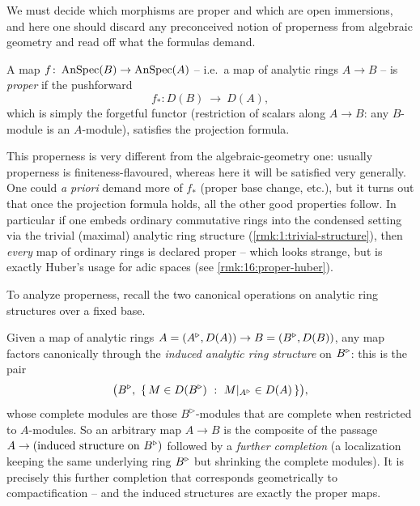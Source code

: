 We must decide which morphisms are proper and which are open immersions, and here one
should discard any preconceived notion of properness from algebraic geometry and read
off what the formulas demand.

\begin{definition}
\label{def:16:proper}
A map $f\colon\operatorname{AnSpec}(B)\to\operatorname{AnSpec}(A)$ -- i.e.\ a map of analytic rings $A\to B$ -- is
\emph{proper} if the pushforward
\begin{equation*}
f_*\colon D(B)\ \longrightarrow\ D(A),
\end{equation*}
which is simply the forgetful functor (restriction of scalars along $A\to B$: any
$B$-module is an $A$-module), satisfies the projection formula.
\end{definition}

\begin{remark}
\label{rmk:16:proper-strange}
This properness is very different from the algebraic-geometry one: usually properness
is finiteness-flavoured, whereas here it will be satisfied very generally. One could
\emph{a priori} demand more of $f_*$ (proper base change, etc.), but it turns out that
once the projection formula holds, all the other good properties follow. In particular
if one embeds ordinary commutative rings into the condensed setting via the trivial
(maximal) analytic ring structure (\cref{rmk:1:trivial-structure}), then \emph{every}
map of ordinary rings is declared proper -- which looks strange, but is exactly
Huber's usage for adic spaces (see \cref{rmk:16:proper-huber}).
\end{remark}

To analyze properness, recall the two canonical operations on analytic ring
structures over a fixed base.

\begin{remark}
\label{rmk:16:induced-structure}
Given a map of analytic rings $A=(A^{\triangleright},D(A))\to B=(B^{\triangleright},D(B))$, any map factors
canonically through the \emph{induced analytic ring structure} on $B^{\triangleright}$: this is
the pair
\begin{equation}
\label{eq:16:induced-structure}
\bigl(B^{\triangleright},\ \{\,M\in D(B^{\triangleright})\ :\ M|_{A^{\triangleright}}\in D(A)\,\}\bigr),
\end{equation}
whose complete modules are those $B^\triangleright$-modules that are complete when
restricted to $A$-modules. So an arbitrary map $A\to B$ is the composite of the
passage $A\to(\text{induced structure on }B^{\triangleright})$ followed by a \emph{further
completion} (a localization keeping the same underlying ring $B^{\triangleright}$ but shrinking the
complete modules). It is precisely this further completion that corresponds
geometrically to compactification -- and the induced structures are exactly the proper
maps.
\end{remark}

